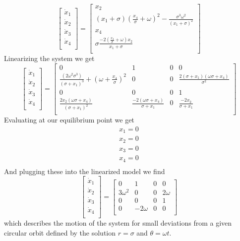 \documentclass{article}
\begin{document}
$$
\begin{bmatrix}
\dot{x}_1\\
\dot{x}_2\\
\dot{x}_3\\
\dot{x}_4\\
\end{bmatrix}
=
\begin{bmatrix}
x_2 \\
(x_1 + \sigma)(\frac{x_4}{\sigma} + \omega)^2 - \frac{\sigma^3\omega^2}{(x_1 + \sigma)^2} \\
x_4 \\
\sigma \frac{-2(\frac{x_4}{\sigma} + \omega)x_2}{x_1+\sigma} \\
\end{bmatrix}
$$
Linearizing the system we get
$$
\begin{bmatrix}
\dot{x}_1\\
\dot{x}_2\\
\dot{x}_3\\
\dot{x}_4\\
\end{bmatrix}
=
\begin{bmatrix}
0 & 1 & 0 & 0 \\
\frac{(2\omega^2\sigma^3)}{(\sigma + x_1)^3} + (\omega + \frac{x_4}{\sigma})^2 & 0 & 0 & \frac{2(\sigma + x_1)(\omega\sigma + x_4)}{\sigma^2} \\
0 & 0 & 0 & 1 \\
\frac{2 x_2 (\omega\sigma + x_4)}{(\sigma + x_1)^2} & \frac{-2(\omega\sigma + x_4)}{\sigma + x_1} & 0 & \frac{-2 x_2}{\sigma + x_1} \\
\end{bmatrix}
$$
Evaluating at our equilibrium point we get
\begin{align*}
x_1 = 0 \\
x_2 = 0 \\
x_3 = 0 \\
x_4 = 0 \\
\end{align*}
And plugging these into the linearized model we find
$$
\begin{bmatrix}
\dot{x}_1\\
\dot{x}_2\\
\dot{x}_3\\
\dot{x}_4\\
\end{bmatrix}
=
\begin{bmatrix}
0 & 1 & 0 & 0 \\
3 \omega^2 & 0 & 0 & 2\omega \\
0 & 0 & 0 & 1 \\
0 & -2\omega & 0 & 0 \\
\end{bmatrix}
$$
which describes the motion of the system for small deviations from a given circular orbit defined by the solution $r = \sigma$ and $\theta = \omega t$.
\end{document}
